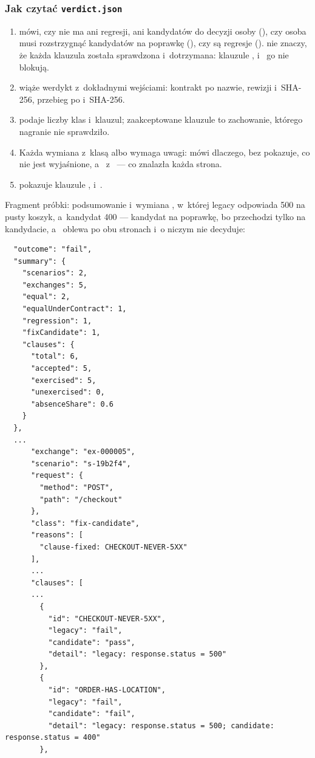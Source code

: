 \subsubsection{Jak czytać \texttt{verdict.json}}

\begin{enumerate}
  \item {} mówi, czy nie ma ani regresji, ani kandydatów do decyzji osoby
        (), czy osoba musi rozstrzygnąć kandydatów na poprawkę
        (), czy są regresje ().  nie znaczy, że każda
        klauzula została sprawdzona i~dotrzymana: klauzule ,
         i~ go nie blokują.
  \item {} wiąże werdykt z~dokładnymi wejściami: kontrakt po nazwie, rewizji i~SHA-256, przebieg po  i~SHA-256.
  \item {} podaje liczby klas i~klauzul; zaakceptowane klauzule
         to zachowanie, którego nagranie nie sprawdziło.
  \item Każda wymiana z~klasą  albo  wymaga
        uwagi:  mówi dlaczego,  bez 
        pokazuje, co nie jest wyjaśnione, a~ z~ --- co
        znalazła każda strona.
  \item {} pokazuje klauzule , 
        i~.
\end{enumerate}

Fragment próbki: podsumowanie i~wymiana , w~której legacy odpowiada 500 na
pusty koszyk, a~kandydat 400 --- kandydat na poprawkę, bo 
przechodzi tylko na kandydacie, a~ oblewa po obu stronach i~o
niczym nie decyduje:

\begin{lstlisting}
  "outcome": "fail",
  "summary": {
    "scenarios": 2,
    "exchanges": 5,
    "equal": 2,
    "equalUnderContract": 1,
    "regression": 1,
    "fixCandidate": 1,
    "clauses": {
      "total": 6,
      "accepted": 5,
      "exercised": 5,
      "unexercised": 0,
      "absenceShare": 0.6
    }
  },
  ...
      "exchange": "ex-000005",
      "scenario": "s-19b2f4",
      "request": {
        "method": "POST",
        "path": "/checkout"
      },
      "class": "fix-candidate",
      "reasons": [
        "clause-fixed: CHECKOUT-NEVER-5XX"
      ],
      ...
      "clauses": [
      ...
        {
          "id": "CHECKOUT-NEVER-5XX",
          "legacy": "fail",
          "candidate": "pass",
          "detail": "legacy: response.status = 500"
        },
        {
          "id": "ORDER-HAS-LOCATION",
          "legacy": "fail",
          "candidate": "fail",
          "detail": "legacy: response.status = 500; candidate: response.status = 400"
        },
\end{lstlisting}

